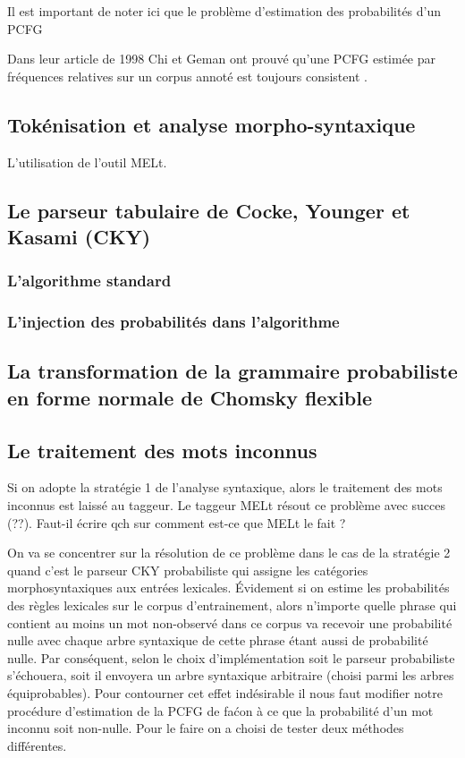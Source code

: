 \documentclass[12pt]{article}
\begin{document}
Il est important de noter ici que le probl\`eme d'estimation des probabilit\'es d'un PCFG

Dans leur article de 1998 Chi et Geman ont prouv\'e qu'une PCFG estim\'ee par fr\'equences relatives sur un corpus annot\'e est toujours consistent \cite{proper_PCFG_estimation}.

\subsection{Tok\'enisation et analyse morpho-syntaxique}

L'utilisation de l'outil MELt.

\subsection{Le parseur tabulaire de Cocke, Younger et Kasami (CKY)}

\subsubsection{L'algorithme standard}
\subsubsection{L'injection des probabilit\'es dans l'algorithme}

\subsection{La transformation de la grammaire probabiliste en forme normale de Chomsky flexible}

\subsection{Le traitement des mots inconnus}

Si on adopte la strat\'egie 1 de l'analyse syntaxique, alors le traitement des mots inconnus est laiss\'e au taggeur.
Le taggeur MELt r\'esout ce probl\`eme avec succes (??). Faut-il \'ecrire qch sur comment est-ce que MELt le fait ?

On va se concentrer sur la r\'esolution de ce probl\`eme dans le cas de la strat\'egie 2 quand c'est le parseur CKY probabiliste qui assigne les cat\'egories morphosyntaxiques aux entr\'ees lexicales. \'Evidement si on estime les probabilit\'es des r\`egles lexicales sur le corpus d'entrainement, alors n'importe quelle phrase qui contient au moins un mot non-observ\'e dans ce corpus va recevoir une probabilit\'e nulle avec chaque arbre syntaxique de cette phrase \'etant aussi de probabilit\'e nulle. Par cons\'equent, selon le choix d'impl\'ementation soit le parseur probabiliste s'\'echouera, soit il envoyera un arbre syntaxique arbitraire (choisi parmi les arbres \'equiprobables). Pour contourner cet effet ind\'esirable il nous faut modifier notre proc\'edure d'estimation de la PCFG de fa\'con \`a ce que la probabilit\'e d'un mot inconnu soit non-nulle. Pour le faire on a choisi de tester deux m\'ethodes diff\'erentes.
\end{document}
